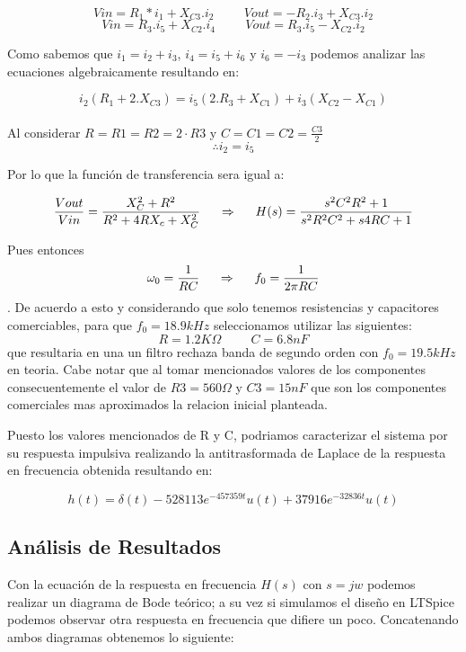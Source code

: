 $$Vin = R_1 *i_1 + X_{C3}.i_2 \hspace{1cm} Vout = -R_2 .i_3 + X_{C3}.i_2$$
$$Vin = R_3 .i_5 + X_{C2}.i_4 \hspace{1cm} Vout = R_3 .i_5 - X_{C2}.i_2$$

Como sabemos que $i_1 = i_2 + i_3$, $i_4 = i_5 + i_6$ y $i_6 = - i_3$ podemos analizar las ecuaciones algebraicamente resultando en:

$$i_2 (R_1 + 2.X_{C3}) = i_5 (2.R_3+X_{C1}) + i_3 (X_{C2} - X_{C1})$$\\


Al considerar $R = R1 = R2 = 2 \cdot R3$ y $C = C1 = C2 = \frac{C3}{2}$ 
$$\therefore i_2 = i_5$$

Por lo que la función de transferencia sera igual a:

$$\frac{Vout}{Vin} = \frac{X_C^2 + R^2}{R^2 + 4RX_c + X_C^2} \hspace{0.5cm}\Rightarrow \hspace{0.5cm} H(s) = \frac{s^2C^2R^2 + 1}{s^2R^2C^2 + s4RC + 1}$$

Pues entonces $$\omega_0 = \frac{1}{RC} \hspace{0.5cm} \Rightarrow \hspace{0.5cm} f_0 = \frac{1}{2\pi RC}$$. De acuerdo a esto y considerando que solo tenemos resistencias y capacitores comerciables, para que $f_0 = 18.9kHz$ seleccionamos utilizar las siguientes:
$$R = 1.2K\Omega \hspace{1cm} C = 6.8nF$$ que resultaria en una un filtro rechaza banda de segundo orden con $f_0 = 19.5kHz$ en teoria. Cabe notar que al tomar mencionados valores de los componentes consecuentemente el valor de $R3 = 560\Omega$ y $C3 = 15nF$ que son los componentes comerciales mas aproximados la relacion inicial planteada.

Puesto los valores mencionados de R y C, podriamos caracterizar el sistema por su respuesta impulsiva realizando la antitrasformada de Laplace de la respuesta en frecuencia obtenida resultando en:

$$h(t) = \delta (t) - 528113e^{-457359t}u(t) + 37916e^{-32836t}u(t)$$

\subsection{Análisis de Resultados}

Con la ecuación de la respuesta en frecuencia $H(s)$ con $s=jw$ podemos realizar un diagrama de Bode teórico; a su vez si simulamos el diseño en LTSpice podemos observar otra respuesta en frecuencia que difiere un poco. Concatenando ambos diagramas obtenemos lo siguiente:



